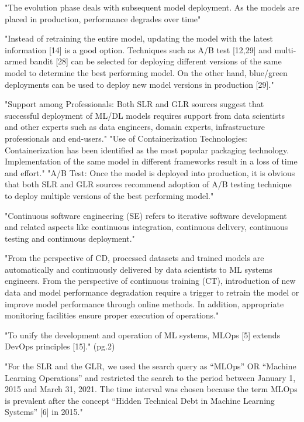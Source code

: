 "The evolution phase deals with subsequent model deployment. As the models are
placed in production, performance degrades over time"

"Instead of retraining the entire model, updating the model with the latest
information [14] is a good option. Techniques such as A/B test [12,29] and
multi-armed bandit [28] can be selected for deploying different versions of the
same model to determine the best performing model. On the other hand, blue/green
deployments can be used to deploy new model versions in production [29]."

"Support among Professionals: Both SLR and GLR sources suggest that successful
deployment of ML/DL models requires support from data scientists and other
experts such as data engineers, domain experts, infrastructure professionals
and end-users."
"Use of Containerization Technologies: Containerization has been identified
as the most popular packaging technology. Implementation of the same model in
different frameworks result in a loss of time and effort."
"A/B Test: Once the model is deployed into production, it is obvious that
both SLR and GLR sources recommend adoption of A/B testing technique to
deploy multiple versions of the best performing model."


\parencite{John2021TowardsModel}

"Continuous software engineering (SE) refers to iterative software development
and related aspects like continuous integration, continuous delivery,
continuous testing and continuous deployment."

"From the perspective of CD, processed datasets and trained models are
automatically and continuously delivered by data scientists to ML systems
engineers. From the perspective of continuous training (CT), introduction of new
data and model performance degradation require a trigger to retrain the model or
improve model performance through online methods. In addition, appropriate
monitoring facilities ensure proper execution of operations."

"To unify the development and operation of ML systems, MLOps [5] extends DevOps
principles [15]." (pg.2)

"For the SLR and the GLR, we used the search query as “MLOps” OR “Machine
Learning Operations” and restricted the search to the period between January 1,
2015 and March 31, 2021. The time interval was chosen because the term MLOps is
prevalent after the concept “Hidden Technical Debt in Machine Learning Systems”
[6] in 2015."

